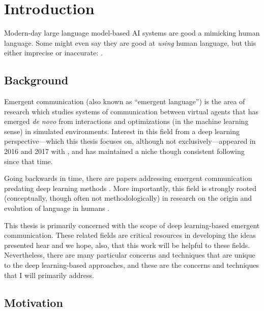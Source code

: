 


\chapter{Introduction}

Modern-day large language model-based AI systems are good a mimicking human language.
Some might even say they are good at \emph{using} human language, but this either imprecise or inaccurate:
  .



\section{Background}

Emergent communication (also known as ``emergent language'') is the area of research which studies systems of communication between virtual agents that has emerged \emph{de novo} from interactions and optimizations (in the machine learning sense) in simulated environments.
Interest in this field from a deep learning perspective---which this thesis focuses on, although not exclusively---appeared in 2016 and 2017 with , and has maintained a niche though consistent following since that time.

Going backwards in time, there are papers addressing emergent communication predating deep learning methods .
More importantly, this field is strongly rooted (conceptually, though often not methodologically) in research on the origin and evolution of language in humans .

This thesis is primarily concerned with the scope of deep learning-based emergent communication.
These related fields are critical resources in developing the ideas presented hear and we hope, also, that this work will be helpful to these fields.
Nevertheless, there are many particular concerns and techniques that are unique to the deep learning-based approaches, and these are the concerns and techniques that I will primarily address.



\section{Motivation}

